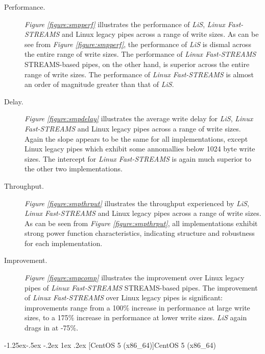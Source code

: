 \documentclass[letterpaper,final,notitlepage,twocolumn,10pt,twoside]{article}
\makeatletter
\renewcommand\subsubsection{\@startsection{subsubsection}{3}{\z@}%
                                     {-1.25ex\@plus -.5ex \@minus -.2ex}%
                                     {1ex \@plus .2ex}%
                                     {\normalfont\normalsize\bfseries}}
\makeatother
\begin{document}
\begin{description}

\item[Performance.]

\textit{Figure \ref{figure:smpperf}} illustrates the performance of
\textsl{LiS}, \textsl{Linux Fast-STREAMS} and Linux legacy pipes across a
range of write sizes.  As can be see from \textit{Figure
\ref{figure:smpperf}}, the performance of \textsl{LiS} is dismal across the
entire range of write sizes.  The performance of \textsl{Linux Fast-STREAMS}
STREAMS-based pipes, on the other hand, is superior across the entire range of
write sizes.  The performance of \textsl{Linux Fast-STREAMS} is almost an
order of magnitude greater than that of \textsl{LiS}.

\item[Delay.]

\textit{Figure \ref{figure:smpdelay}} illustrates the average write delay for
\textsl{LiS}, \textsl{Linux Fast-STREAMS} and Linux legacy pipes across a
range of write sizes.  Again the slope appears to be the same for all
implementations, except Linux legacy pipes which exhibit some annomallies
below 1024 byte write sizes.  The intercept for \textsl{Linux Fast-STREAMS} is
again much superior to the other two implementations.

\item[Throughput.]

\textit{Figure \ref{figure:smpthrput}} illustrates the throughput experienced
by \textsl{LiS}, \textsl{Linux Fast-STREAMS} and Linux legacy pipes across a
range of write sizes.  As can be seen from \textit{Figure
\ref{figure:smpthrput}}, all implementations exhibit strong power function
characteristics, indicating structure and robustness for each implementation.

\item[Improvement.]

\textit{Figure \ref{figure:smpcomp}} illustrates the improvement over Linux
legacy pipes of \textsl{Linux Fast-STREAMS} STREAMS-based pipes.  The
improvement of \textsl{Linux Fast-STREAMS} over Linux legacy pipes is
significant: improvements range from a 100\% increase in performance at large
write sizes, to a 175\% increase in performance at lower write sizes.
\textsl{LiS} again drags in at -75\%.

\end{description}

\subsubsection[CentOS 5 (x86\_64)]{CentOS 5 (x86\_64)}
\end{document}
